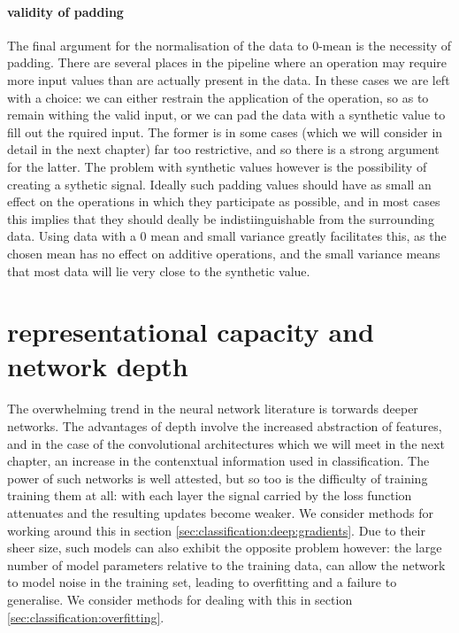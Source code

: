 \documentclass[msc]{infthesis}
\begin{document}
\paragraph*{validity of padding}
%
The final argument for the normalisation of the data to 0-mean is the necessity of padding.
There are several places in the pipeline where an operation may require more input values than
are actually present in the data.  In these cases we are left with a choice: we can either
restrain the application of the operation, so as to remain withing the valid input, or we can
pad the data with a synthetic value to fill out the rquired input.  The former is in some cases
(which we will consider in detail in the next chapter) far too restrictive, and so there is a
strong argument for the latter.  The problem with synthetic values however is the possibility of
creating a sythetic signal.  Ideally such padding values should have as small an effect on the
operations in which they participate as possible, and in most cases this implies that they
should deally be indistiinguishable from the surrounding data.  Using data with a 0 mean and
small variance greatly facilitates this, as the chosen mean has no effect on additive
operations, and the small variance means that most data will lie very close to the synthetic
value.






\section{representational capacity and network depth}
\label{sec:classification:depth}

The overwhelming trend in the neural network literature is torwards deeper
networks.\cite{simonyan2014very} The advantages of depth involve the increased abstraction of
features, and in the case of the convolutional architectures which we will meet in the next
chapter, an increase in the contenxtual information used in classification.  The power of such
networks is well attested, but so too is the difficulty of training training them at all: with
each layer the signal carried by the loss function attenuates and the resulting updates become
weaker.  We consider methods for working around this in section
\ref{sec:classification:deep:gradients}.  Due to their sheer size, such models can also exhibit
the opposite problem however: the large number of model parameters relative to the training
data, can allow the network to model noise in the training set, leading to overfitting and a
failure to generalise.  We consider methods for dealing with this in section
\ref{sec:classification:overfitting}.
\end{document}

